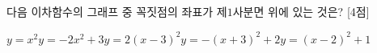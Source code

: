 다음 이차함수의 그래프 중 꼭짓점의 좌표가 제$1$사분면 위에 있는 것은? \mbox{[4점]}
\begin{choicesii}{$y=x^2$}{$y=-2x^2+3$}{$y=2(x-3)^2$}{$y=-(x+3)^2+2$}{$y=(x-2)^2+1$}\end{choicesii}
